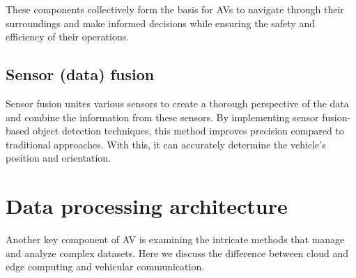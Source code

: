 \documentclass[10pt,oneside,english,a4paper]{article}
\begin{document}
\par These components collectively form the basis for AVs to navigate through their surroundings and make informed decisions while ensuring the safety and efficiency of their operations. \cite{stateoftheart, functionalarch, approach, computerarch, AIandIoT}

\subsection{Sensor (data) fusion} \label{fusion}
\indent Sensor fusion unites various sensors to create a thorough perspective of the data and combine the information from these sensors. By implementing sensor fusion-based object detection techniques, this method improves precision compared to traditional approaches. With this, it can accurately determine the vehicle's position and orientation. \cite{AIandIoT, Sensorfusion}


\section{Data processing architecture} \label{architecture}
Another key component of AV is examining the intricate methods that manage and analyze complex datasets. Here we discuss the difference between cloud and edge computing and vehicular communication. 
\end{document}
